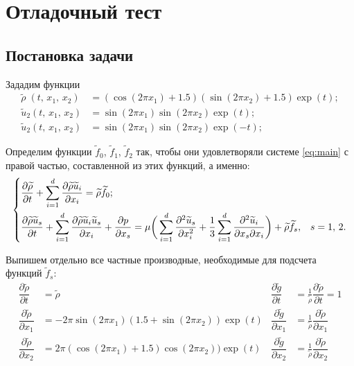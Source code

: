 \section{Отладочный тест}

\subsection{Постановка задачи}
Зададим функции
\begin{equation} \label{eq:task1}
\begin{aligned}
\widetilde{\rho}\; (t, \, x_1, \, x_2) &= (\cos (2 \pi x_1) + 1.5) (\sin (2 \pi x_2) + 1.5) \exp (t);\\
\widetilde{u}_2 (t, \, x_1, \, x_2) &= \sin (2 \pi x_1) \sin (2 \pi x_2) \exp (t); \\
\widetilde{u}_2 (t, \, x_1, \, x_2) &= \sin (2 \pi x_1) \sin (2 \pi x_2) \exp (-t);
\end{aligned}
\end{equation}

Определим функции $\widetilde{f}_0$, $\widetilde{f}_1$, $\widetilde{f}_2$ так,
чтобы они удовлетворяли системе \eqref{eq:main} с правой частью, составленной из этих функций, а именно:
\begin{equation}
\begin{dcases}
\deriv{\widetilde{\rho}}{t}
+
\sum_{i = 1}^{d} \deriv{\widetilde{\rho} \widetilde{u}_i}{x_i}
=
\widetilde{\rho} \widetilde{f}_0; \\
%
%
%
\deriv{\widetilde{\rho} \widetilde{u}_s}{t}
+
\sum_{i = 1}^{d} \deriv{\widetilde{\rho} \widetilde{u}_i \widetilde{u}_s}{x_i}
+
\deriv{p}{x_s}
=
\mu \bigg( \sum_{i = 1}^{d} \deriv{^2 \widetilde{u}_s}{x_i^2}
+
\frac{1}{3} \sum_{i = 1}^{d} \deriv{^2 \widetilde{u}_i}{x_s \partial x_i} \bigg)
+
\widetilde{\rho} \widetilde{f}_s,
& s = 1, \, 2.
\end{dcases}
\end{equation}

Выпишем отдельно все частные производные, необходимые для подсчета функций $\widetilde{f}_s$:
\begin{align*}
    \dfrac{\partial \tilde{\rho}}{\partial t} \;
          &= \tilde{\rho}
  & \dfrac{\partial \tilde{g}}{\partial t} \;
          &= \frac{1}{\tilde{\rho}} \dfrac{\partial \tilde{\rho}}{\partial t} = 1 \\  
    \dfrac{\partial \tilde{\rho}}{\partial x_1}
          &= -2 \pi \sin (2 \pi x_1) (1.5 + \sin(2 \pi x_2)) \exp (t)
  & \dfrac{\partial \tilde{g}}{\partial x_1}
          &= \frac{1}{\tilde{\rho}} \dfrac{\partial \tilde{\rho}}{\partial x_1} \\
    \dfrac{\partial \tilde{\rho}}{\partial x_2}
          &=  2 \pi (\cos (2 \pi x_1) + 1.5) \cos(2 \pi x_2)) \exp (t)
  & \dfrac{\partial \tilde{g}}{\partial x_2}
          &= \frac{1}{\tilde{\rho}} \dfrac{\partial \tilde{\rho}}{\partial x_2}
\end{align*}

